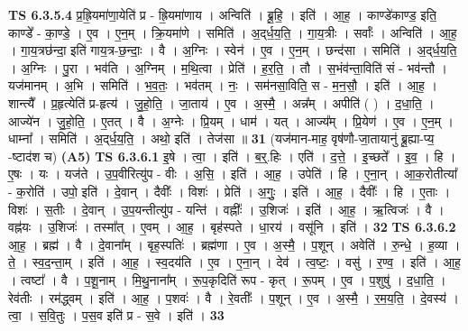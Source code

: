 \documentclass[17pt]{extarticle}
\begin{document}
                  \newline
                                \textbf{ TS 6.3.5.4} \newline
                  प्र॒ह्रि॒यमा॑णा॒येति॑ प्र - ह्रि॒यमा॑णाय । अन्विति॑ । ब्रू॒हि॒ । इति॑ । आ॒ह॒ । काण्डे॑काण्ड॒ इति॒ काण्डे᳚ - का॒ण्डे॒ । ए॒व । ए॒न॒म् । क्रि॒यमा॑णे । समिति॑ । अ॒द्‌र्ध॒य॒ति॒ । गा॒य॒त्रीः । सर्वाः᳚ । अन्विति॑ । आ॒ह॒ । गा॒य॒त्रछ॑न्दा॒ इति॑ गाय॒त्र-छ॒न्दाः॒ । वै । अ॒ग्निः । स्वेन॑ । ए॒व । ए॒न॒म् । छन्द॑सा । समिति॑ । अ॒द्‌र्ध॒य॒ति॒ । अ॒ग्निः । पु॒रा । भव॑ति । अ॒ग्निम् । म॒थि॒त्वा । प्रेति॑ । ह॒र॒ति॒ । तौ । स॒भंव॑न्ता॒विति॑ सं - भव॑न्तौ । यज॑मानम् । अ॒भि । समिति॑ । भ॒व॒तः॒ । भव॑तम् । नः॒ । सम॑नसा॒विति॒ स - म॒न॒सौ॒ । इति॑ । आ॒ह॒ । शान्त्यै᳚ । प्र॒हृत्येति॑ प्र-हृत्य॑ । जु॒हो॒ति॒ । जा॒ताय॑ । ए॒व । अ॒स्मै॒ । अन्न᳚म् । अपीति॑ ( ) । द॒धा॒ति॒ । आज्ये॑न । जु॒हो॒ति॒ । ए॒तत् । वै । अ॒ग्नेः । प्रि॒यम् । धाम॑ । यत् । आज्य᳚म् । प्रि॒येण॑ । ए॒व । ए॒न॒म् । धाम्ना᳚ । समिति॑ । अ॒द्‌र्ध॒य॒ति॒ । अथो॒ इति॑ । तेज॑सा ॥ \textbf{  31} \newline
                  \newline
                      (यज॑मान-माह॒ वृष॑णौ-जा॒तायानु॑ ब्रू॒ह्या-प्य॒ -ष्टाद॑श च)  \textbf{(A5)} \newline \newline
                                \textbf{ TS 6.3.6.1} \newline
                  इ॒षे । त्वा॒ । इति॑ । ब॒र्॒.हिः । एति॑ । द॒त्ते॒ । इ॒च्छते᳚ । इ॒व॒ । हि । ए॒षः । यः । यज॑ते । उ॒प॒वीरित्यु॑प - वीः । अ॒सि॒ । इति॑ । आ॒ह॒ । उपेति॑ । हि । ए॒ना॒न् । आ॒क॒रोतीत्या᳚ - क॒रोति॑ । उपो॒ इति॑ । दे॒वान् । दैवीः᳚ । विशः॑ । प्रेति॑ । अ॒गुः॒ । इति॑ । आ॒ह॒ । दैवीः᳚ । हि । ए॒ताः । विशः॑ । स॒तीः । दे॒वान् । उ॒प॒यन्तीत्यु॑प - यन्ति॑ । वह्नीः᳚ । उ॒शिजः॑ । इति॑ । आ॒ह॒ । ऋ॒त्विजः॑ । वै । वह्न॑यः । उ॒शिजः॑ । तस्मा᳚त् । ए॒वम् । आ॒ह॒ । बृह॑स्पते । धा॒रय॑ । वसू॑नि । इति॑ । \textbf{  32} \newline
                  \newline
                                \textbf{ TS 6.3.6.2} \newline
                  आ॒ह॒ । ब्रह्म॑ । वै । दे॒वाना᳚म् । बृह॒स्पतिः॑ । ब्रह्म॑णा । ए॒व । अ॒स्मै॒ । प॒शून् । अवेति॑ । रु॒न्धे॒ । ह॒व्या । ते॒ । स्व॒द॒न्ता॒म् । इति॑ । आ॒ह॒ । स्व॒दय॑ति । ए॒व । ए॒ना॒न् । देव॑ । त्व॒ष्टः॒ । वसु॑ । र॒ण्व॒ । इति॑ । आ॒ह॒ । त्वष्टा᳚ । वै । प॒शू॒नाम् । मि॒थु॒नाना᳚म् । रू॒प॒कृदिति॑ रूप - कृत् । रू॒पम् । ए॒व । प॒शुषु॑ । द॒धा॒ति॒ । रेव॑तीः । रम॑द्ध्वम् । इति॑ । आ॒ह॒ । प॒शवः॑ । वै । रे॒वतीः᳚ । प॒शून् । ए॒व । अ॒स्मै॒ । र॒म॒य॒ति॒ । दे॒वस्य॑ । त्वा॒ । स॒वि॒तुः । प॒स॒व इति॑ प्र - स॒वे । इति॑ । \textbf{  33} \newline
\end{document}
